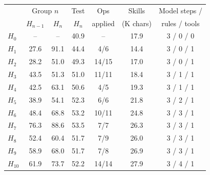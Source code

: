 \begin{tabular}{@{}lcccccc@{}}
\toprule
& \multicolumn{2}{c}{Group $n$} & Test & Ops & Skills & Model steps / \\
& $H_{n-1}$ & $H_n$ & $H_n$ & applied & (K chars) & rules / tools \\
\midrule
$H_0$ & -- & -- & 40.9 & -- & 17.9 & 3 / 0 / 0 \\
$H_{1}$ & 27.6 & 91.1 & 44.4 & 4/6 & 14.4 & 3 / 0 / 1 \\
$H_{2}$ & 28.2 & 51.0 & 49.3 & 14/15 & 17.0 & 3 / 0 / 1 \\
$H_{3}$ & 43.5 & 51.3 & 51.0 & 11/11 & 18.4 & 3 / 1 / 1 \\
$H_{4}$ & 42.5 & 63.1 & 50.6 & 4/5 & 19.3 & 3 / 1 / 1 \\
$H_{5}$ & 38.9 & 54.1 & 52.3 & 6/6 & 21.8 & 3 / 2 / 1 \\
$H_{6}$ & 48.4 & 68.8 & 53.2 & 10/11 & 24.8 & 3 / 3 / 1 \\
$H_{7}$ & 76.3 & 88.6 & 53.5 & 7/7 & 26.3 & 3 / 3 / 1 \\
$H_{8}$ & 52.4 & 60.4 & 51.7 & 7/9 & 26.0 & 3 / 3 / 1 \\
$H_{9}$ & 58.9 & 68.0 & 51.7 & 7/8 & 26.9 & 3 / 3 / 1 \\
$H_{10}$ & 61.9 & 73.7 & 52.2 & 14/14 & 27.9 & 3 / 4 / 1 \\
\bottomrule
\end{tabular}
